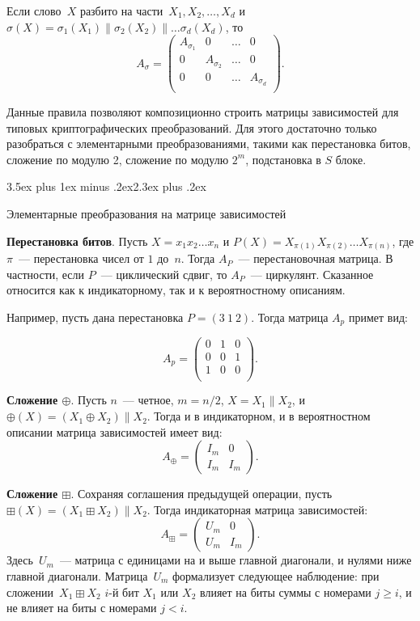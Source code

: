 \documentclass[a4paper,12pt]{report}
\makeatletter
\theoremstyle{plain} %
\theoremstyle{definition}
\theoremstyle{remark}
\renewcommand{\section}{\@startsection{section}{1}{18pt}%
{3.5ex plus 1ex minus .2ex}{2.3ex plus .2ex}%
{\normalfont\Large\bfseries\raggedright}}%
\makeatother
\begin{document}
\begin{large}
Если слово~$X$ разбито на части~$X_1,X_2,\ldots,X_d$ 
и~$\sigma(X)=\sigma_1(X_1)\parallel\sigma_2(X_2)\parallel\ldots\sigma_d(X_d)$,
то
$$
A_\sigma=
\begin{pmatrix}
A_{\sigma_1} & 0 & \ldots & 0\\
0 & A_{\sigma_2} & \ldots & 0\\
0 &   0          & \ldots & A_{\sigma_d}\\
\end{pmatrix}.
$$

Данные правила позволяют композиционно строить матрицы 
зависимостей для типовых криптографических преобразований.
Для этого достаточно только разобраться с элементарными преобразованиями, такими как перестановка битов, сложение по модулю 2, сложение по модулю $2^m$, подстановка в $S$ блоке.

\section{Элементарные преобразования на матрице зависимостей}


{\bf Перестановка битов}.
Пусть $X=x_1x_2\ldots x_n$
и $P(X)=X_{\pi(1)}X_{\pi(2)}\ldots X_{\pi(n)}$,
где $\pi$~--- перестановка чисел от $1$ до~$n$.
Тогда $A_P$~--- перестановочная матрица.
В частности, если $P$~--- циклический сдвиг,
то $A_P$~--- циркулянт. Сказанное относится
как к индикаторному, так и к вероятностному описаниям.

Например, пусть дана перестановка $P = (3~1~2)$. Тогда матрица $A_p$ примет вид:

$$
A_p = 
\begin{pmatrix} 
0 & 1 & 0\\ 
0 & 0 & 1\\ 
1 & 0 & 0\\
\end{pmatrix}.
$$

{\bf Сложение $\oplus$}.
Пусть $n$~--- четное, $m=n/2$,
$X=X_1\parallel X_2$, 
и $\oplus(X)=(X_1\oplus X_2)\parallel X_2$.
Тогда и в индикаторном, и в вероятностном описании 
матрица зависимостей имеет вид:
$$
A_\oplus = 
\begin{pmatrix} 
I_m & 0\\ 
I_m & I_m 
\end{pmatrix}.
$$

{\bf Сложение $\boxplus$}.
Сохраняя соглашения предыдущей операции,
пусть $\boxplus(X)=(X_1\boxplus X_2)\parallel X_2$.
Тогда индикаторная матрица зависимостей:
$$
A_\boxplus = 
\begin{pmatrix} 
U_m & 0\\ 
U_m & I_m 
\end{pmatrix}.
$$
Здесь~$U_m$~--- матрица с единицами на и выше главной диагонали,
и нулями ниже главной диагонали. Матрица~$U_m$ формализует 
следующее наблюдение: при сложении~$X_1\boxplus X_2$
$i$-й бит $X_1$ или $X_2$ влияет на биты суммы с номерами $j\geq i$,
и не влияет на биты с номерами $j<i$.


\end{large}
\end{document}
